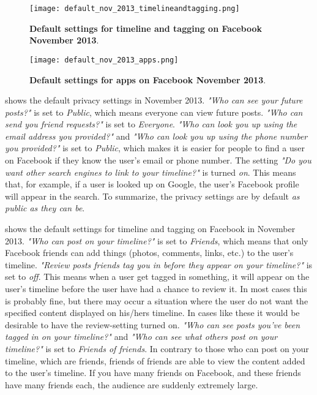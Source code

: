 \begin{figure}[b]
\centering
\texttt{[image: default\_nov\_2013\_timelineandtagging.png]}
\caption[Default settings for timeline and tagging on Facebook November 2013]{\textbf{Default settings for timeline and tagging on Facebook November 2013}.} 
\label{fig:timelineandtagging2013}
\end{figure}

\begin{figure}[t]
\centering
\texttt{[image: default\_nov\_2013\_apps.png]}
\caption[Default settings for apps on Facebook November 2013]{\textbf{Default  settings for apps on Facebook November 2013}.} 
\label{fig:apps2013}
\end{figure}

 shows the default privacy settings in November 2013.  \textit{"Who can see your future posts?"} is set to \textit{Public}, which means everyone can view future posts. \textit{"Who can send you friend requests?"} is set to \textit{Everyone}. \textit{"Who can look you up using the email address you provided?"} and \textit{"Who can look you up using the phone number you provided?"} is set to \textit{Public}, which makes it is easier for people to find a user on Facebook if they know the user's email or phone number. The setting \textit{"Do you want other search engines to link to your timeline?"} is turned \textit{on}. This means that, for example, if a user is looked up on Google, the user's Facebook profile will appear in the search. To summarize, the privacy settings are by default \textit{as public as they can be}.

 shows the default settings for timeline and tagging on Facebook in November 2013. \textit{"Who can post on your timeline?"} is set to \textit{Friends}, which means that only Facebook friends can add things (photos, comments, links, etc.) to the user's timeline. \textit{"Review posts friends tag you in before they appear on your timeline?" }is set to\textit{ off}. This means when a user get tagged in something, it will appear on the user's timeline before the user have had a chance to review it. In most cases this is probably fine, but there may occur a situation where the user do not want the specified content displayed on his/hers timeline. In cases like these it would be desirable to have the review-setting turned on. \textit{"Who can see posts you've been tagged in on your timeline?"} and \textit{"Who can see what others post on your timeline?"} is set to \textit{Friends of friends}. In contrary to those who can post on your timeline, which are friends, friends of friends are able to view the content added to the user's timeline. If you have many friends on Facebook, and these friends have many friends each, the audience are suddenly extremely large. 

